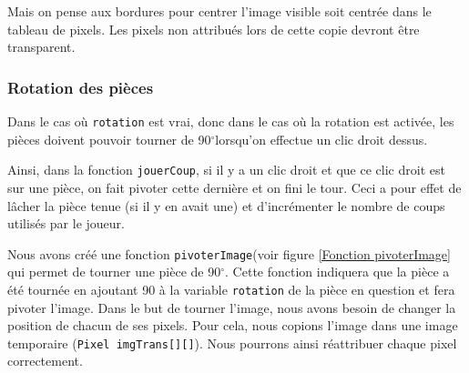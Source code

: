 \documentclass[]{article}
\newcommand{\variable}[1]{\noindent \texttt{#1}}
\newcommand{\degr}[0]{$^\circ$}
\begin{document}
Mais on pense aux bordures pour centrer l'image visible soit centrée dans le tableau de pixels. Les pixels non attribués lors de cette copie devront être transparent.

\subsubsection{Rotation des pièces}

Dans le cas où \variable{rotation} est vrai, donc dans le cas où la rotation est activée, les pièces doivent pouvoir tourner de 90\degr lorsqu'on effectue un clic droit dessus.

Ainsi, dans la fonction \variable{jouerCoup}, si il y a un clic droit et que ce clic droit est sur une pièce, on fait pivoter cette dernière et on fini le tour. Ceci a pour effet de lâcher la pièce tenue (si il y en avait une) et d'incrémenter le nombre de coups utilisés par le joueur.

Nous avons créé une fonction \variable{pivoterImage}(voir figure \no\ref{Fonction pivoterImage} qui permet de tourner une pièce de 90\degr. Cette fonction indiquera que la pièce a été tournée en ajoutant 90 à la variable \variable{rotation} de la pièce en question et fera pivoter l'image. Dans le but de tourner l'image, nous avons besoin de changer la position de chacun de ses pixels. Pour cela, nous copions l'image dans une image temporaire (\variable{Pixel imgTrans[][]}). Nous pourrons ainsi réattribuer chaque pixel correctement.
\end{document}
